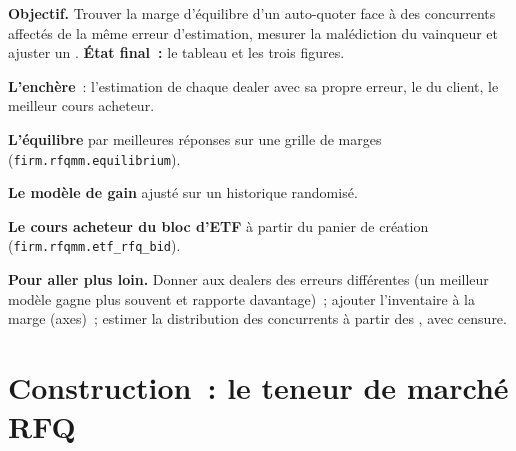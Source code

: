 \begin{tutorial}
\textbf{Objectif.} Trouver la marge d'équilibre d'un auto-quoter face à des concurrents affectés de la même erreur d'estimation, mesurer la malédiction du vainqueur et ajuster
un . \textbf{État final~:} le tableau et les trois figures.
\begin{tutsteps}
\item \textbf{L'enchère}~: l'estimation de chaque dealer avec sa propre erreur, le  du client, le meilleur cours acheteur.
\label{lst:hf:bond-and-etf-request-for-quote-market-making:sim}
\item \textbf{L'équilibre} par meilleures réponses sur une grille de marges (\texttt{firm.rfqmm.equilibrium}).
\item \textbf{Le modèle de gain} ajusté sur un historique randomisé.
\label{lst:hf:bond-and-etf-request-for-quote-market-making:win}
\item \textbf{Le cours acheteur du bloc d'ETF} à partir du panier de création (\texttt{firm.rfqmm.etf\_rfq\_bid}).
\end{tutsteps}
\textbf{Pour aller plus loin.} Donner aux dealers des erreurs différentes (un meilleur modèle gagne plus souvent et rapporte davantage)~; ajouter l'inventaire à la marge (axes)~;
estimer la distribution des concurrents à partir des , avec censure.
\end{tutorial}

\section{Construction~: le teneur de marché RFQ}\label{bld:hf:bond-and-etf-request-for-quote-market-making:rfqmm}

